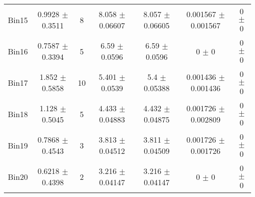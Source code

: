 \begin{tabular}{@{\extracolsep{4pt}}lcccccc@{}}
     Bin15 & 0.9928 $\pm$ 0.3511 & 8 & 8.058 $\pm$ 0.06607 & 8.057 $\pm$ 0.06605 & 0.001567 $\pm$ 0.001567 & 0 $\pm$ 0 \\ 
     Bin16 & 0.7587 $\pm$ 0.3394 & 5 & 6.59 $\pm$ 0.0596 & 6.59 $\pm$ 0.0596 & 0 $\pm$ 0 & 0 $\pm$ 0 \\ 
     Bin17 & 1.852 $\pm$ 0.5858 & 10 & 5.401 $\pm$ 0.0539 & 5.4 $\pm$ 0.05388 & 0.001436 $\pm$ 0.001436 & 0 $\pm$ 0 \\ 
     Bin18 & 1.128 $\pm$ 0.5045 & 5 & 4.433 $\pm$ 0.04883 & 4.432 $\pm$ 0.04875 & 0.001726 $\pm$ 0.002809 & 0 $\pm$ 0 \\ 
     Bin19 & 0.7868 $\pm$ 0.4543 & 3 & 3.813 $\pm$ 0.04512 & 3.811 $\pm$ 0.04509 & 0.001726 $\pm$ 0.001726 & 0 $\pm$ 0 \\ 
     Bin20 & 0.6218 $\pm$ 0.4398 & 2 & 3.216 $\pm$ 0.04147 & 3.216 $\pm$ 0.04147 & 0 $\pm$ 0 & 0 $\pm$ 0 \\ 
\hline\hline
  \end{tabular}
